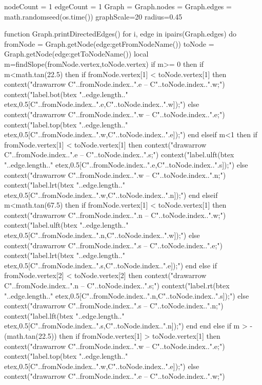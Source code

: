 
\startluacode
nodeCount = 1
edgeCount = 1
Graph = {}
Graph.nodes = {}
Graph.edges = {}
math.randomseed(os.time())
graphScale=20
radius=0.45

function Graph.printDirectedEdges()
	for i, edge in ipairs(Graph.edges) do
		fromNode = Graph.getNode(edge:getFromNodeName())
		toNode = Graph.getNode(edge:getToNodeName())
		local m=findSlope(fromNode.vertex,toNode.vertex)
		if m>= 0 then
			if m<math.tan(22.5) then
				if fromNode.vertex[1] < toNode.vertex[1] then
					context("drawarrow C"..fromNode.index..".e -- C"..toNode.index..".w;")
					context("label.bot(btex "..edge.length.." etex,0.5[C"..fromNode.index..".e,C"..toNode.index..".w]);")
				else
					context("drawarrow C"..fromNode.index..".w -- C"..toNode.index..".e;")
					context("label.top(btex "..edge.length.." etex,0.5[C"..fromNode.index..".w,C"..toNode.index..".e]);")
				end
			elseif m<1 then
				if fromNode.vertex[1] < toNode.vertex[1] then
					context("drawarrow C"..fromNode.index..".e -- C"..toNode.index..".s;")
					context("label.ulft(btex "..edge.length.." etex,0.5[C"..fromNode.index..".e,C"..toNode.index..".s]);")
				else
					context("drawarrow C"..fromNode.index..".w -- C"..toNode.index..".n;")
					context("label.lrt(btex "..edge.length.." etex,0.5[C"..fromNode.index..".w,C"..toNode.index..".n]);")
				end
			elseif m<math.tan(67.5) then
				if fromNode.vertex[1] < toNode.vertex[1] then
					context("drawarrow C"..fromNode.index..".n -- C"..toNode.index..".w;")
					context("label.ulft(btex "..edge.length.." etex,0.5[C"..fromNode.index..".n,C"..toNode.index..".w]);")
				else
					context("drawarrow C"..fromNode.index..".s -- C"..toNode.index..".e;")
					context("label.lrt(btex "..edge.length.." etex,0.5[C"..fromNode.index..".s,C"..toNode.index..".e]);")
				end
			else
				if fromNode.vertex[2] < toNode.vertex[2] then
					context("drawarrow C"..fromNode.index..".n -- C"..toNode.index..".s;")
					context("label.rt(btex "..edge.length.." etex,0.5[C"..fromNode.index..".n,C"..toNode.index..".s]);")
				else
					context("drawarrow C"..fromNode.index..".s -- C"..toNode.index..".n;")
					context("label.lft(btex "..edge.length.." etex,0.5[C"..fromNode.index..".s,C"..toNode.index..".n]);")
				end
			end
		else
			if m > -(math.tan(22.5)) then
				if fromNode.vertex[1] > toNode.vertex[1] then
					context("drawarrow C"..fromNode.index..".w -- C"..toNode.index..".e;")
					context("label.top(btex "..edge.length.." etex,0.5[C"..fromNode.index..".w,C"..toNode.index..".e]);")
				else
					context("drawarrow C"..fromNode.index..".e -- C"..toNode.index..".w;")
